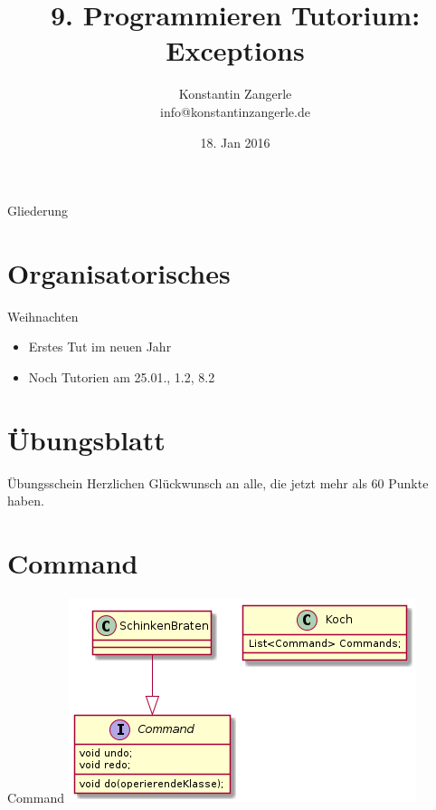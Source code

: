 \documentclass[18pt]{beamer}
\title[Programmieren Tutorium]{9. Programmieren Tutorium:\texorpdfstring{\\}{} Exceptions}
\author{Konstantin Zangerle \texorpdfstring{\\}{} info@konstantinzangerle.de}
\date{18. Jan 2016}
\begin{document}

\begin{frame}
\titlepage
\end{frame}

\begin{frame}{Gliederung}
\tableofcontents
\end{frame}

\section{Organisatorisches}

\begin{frame}{Weihnachten}
 \begin{itemize}
  \item Erstes Tut im neuen Jahr
  \item Noch Tutorien am 25.01., 1.2, 8.2
 \end{itemize}

\end{frame}





\section{Übungsblatt}
\begin{frame}{Übungsschein}
  \large
  Herzlichen Glückwunsch an alle, die jetzt mehr als 60 Punkte haben.
\end{frame}


\section{Command}

\begin{frame}{Command}
 \includegraphics[scale=0.6]{command}
\end{frame}
\end{document}
